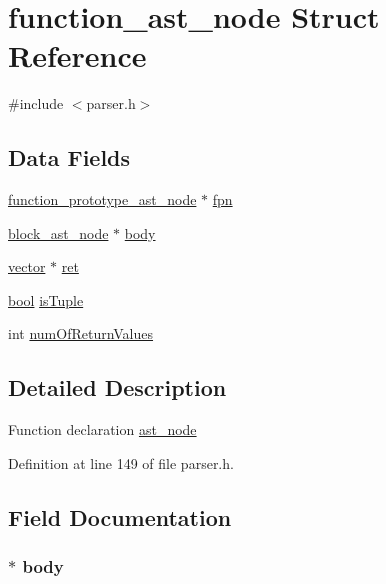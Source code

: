 \hypertarget{structfunction__ast__node}{\section{function\+\_\+ast\+\_\+node Struct Reference}
\label{structfunction__ast__node}
}


{\ttfamily \#include $<$parser.\+h$>$}

\subsection*{Data Fields}
\begin{DoxyCompactItemize}
\item 
\hyperlink{structfunction__prototype__ast__node}{function\+\_\+prototype\+\_\+ast\+\_\+node} $\ast$ \hyperlink{structfunction__ast__node_a7aa08eb03840d9cd4a00eceb4a33651e}{fpn}
\item 
\hyperlink{structblock__ast__node}{block\+\_\+ast\+\_\+node} $\ast$ \hyperlink{structfunction__ast__node_a8b3e0335ffa487088d6f3c5ea9424235}{body}
\item 
\hyperlink{structvector}{vector} $\ast$ \hyperlink{structfunction__ast__node_a064a5f35fdc8f72e5ff6b9b68d8b4514}{ret}
\item 
\hyperlink{util_8h_af6a258d8f3ee5206d682d799316314b1}{bool} \hyperlink{structfunction__ast__node_a5f5d542e1e598f0aa87a26386f88346a}{is\+Tuple}
\item 
int \hyperlink{structfunction__ast__node_a53a6c9388097639e5b67cd4b368f98d1}{num\+Of\+Return\+Values}
\end{DoxyCompactItemize}


\subsection{Detailed Description}
Function declaration \hyperlink{structast__node}{ast\+\_\+node} 

Definition at line 149 of file parser.\+h.



\subsection{Field Documentation}
\hypertarget{structfunction__ast__node_a8b3e0335ffa487088d6f3c5ea9424235}{
\subsubsection[{body}]{$\ast$ body}}\label{structfunction__ast__node_a8b3e0335ffa487088d6f3c5ea9424235}


